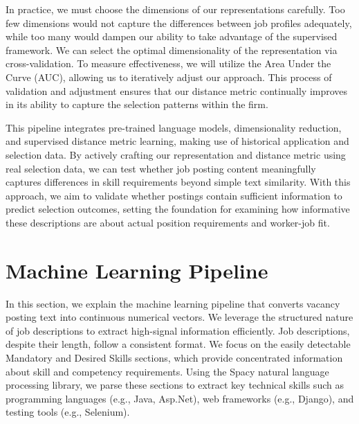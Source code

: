 \documentclass[12pt]{article}
\begin{document}
In practice, we must choose the dimensions of our representations carefully. Too few dimensions would not capture the differences between job profiles adequately, while too many would dampen our ability to take advantage of the supervised framework. We can select the optimal dimensionality of the representation via cross-validation. To measure effectiveness, we will utilize the Area Under the Curve (AUC), allowing us to iteratively adjust our approach. This process of validation and adjustment ensures that our distance metric continually improves in its ability to capture the selection patterns within the firm.


This pipeline integrates pre-trained language models, dimensionality reduction, and supervised distance metric learning, making use of historical application and selection data. By actively crafting our representation and distance metric using real selection data, we can test whether job posting content meaningfully captures differences in skill requirements beyond simple text similarity. With this approach, we aim to validate whether postings contain sufficient information to predict selection outcomes, setting the foundation for examining how informative these descriptions are about actual position requirements and worker-job fit.


\section{Machine Learning Pipeline}\label{sec:machine_learning_pipeline}

In this section, we explain the machine learning pipeline that converts vacancy posting text into continuous numerical vectors. We leverage the structured nature of job descriptions to extract high-signal information efficiently. Job descriptions, despite their length, follow a consistent format. We focus on the easily detectable Mandatory and Desired Skills sections, which provide concentrated information about skill and competency requirements. Using the Spacy natural language processing library, we parse these sections to extract key technical skills such as programming languages (e.g., Java, Asp.Net), web frameworks (e.g., Django), and testing tools (e.g., Selenium).
\end{document}
